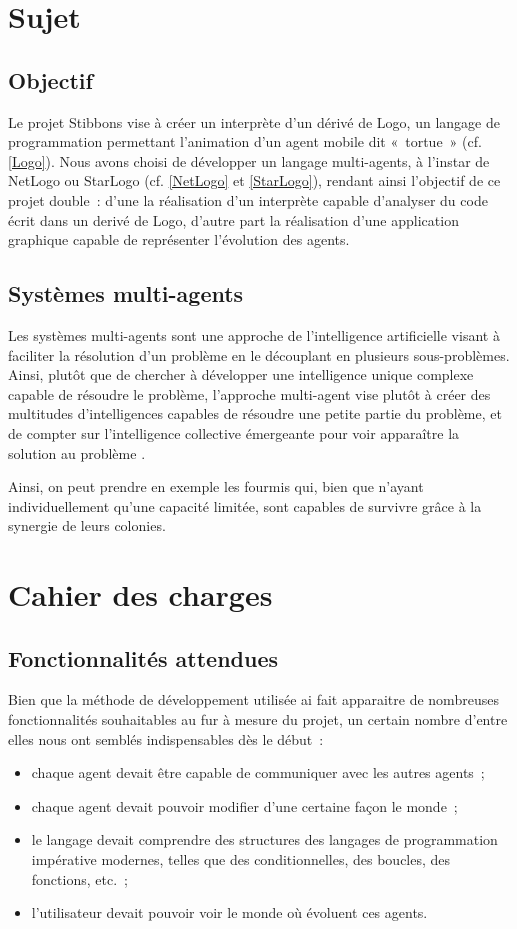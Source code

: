 \section{Sujet}
	\subsection{Objectif}
	Le projet Stibbons vise à créer un interprète d'un dérivé de Logo, un langage de programmation permettant l'animation d'un agent mobile dit «~tortue~» (cf. \ref{Logo}). Nous avons choisi de développer un langage multi-agents, à l'instar de NetLogo ou StarLogo (cf. \ref{NetLogo} et \ref{StarLogo}), rendant ainsi l'objectif de ce projet double~: d'une la réalisation d'un interprète capable d'analyser du code écrit dans un derivé de Logo, d'autre part la réalisation d'une application graphique capable de représenter l'évolution des agents.

	\subsection{Systèmes multi-agents}
	Les systèmes multi-agents sont une approche de l'intelligence artificielle visant à faciliter la résolution d'un problème en le découplant en plusieurs sous-problèmes. Ainsi, plutôt que de chercher à développer une intelligence unique complexe capable de résoudre le problème, l'approche multi-agent vise plutôt à créer des multitudes d'intelligences capables de résoudre une petite partie du problème, et de compter sur l'intelligence collective émergeante pour voir apparaître la solution au problème \cite{sma}.

	Ainsi, on peut prendre en exemple les fourmis qui, bien que n'ayant individuellement qu'une capacité limitée, sont capables de survivre grâce à la synergie de leurs colonies.

\section{Cahier des charges}
	\subsection{Fonctionnalités attendues}
	Bien que la méthode de développement utilisée ai fait apparaitre de nombreuses fonctionnalités souhaitables au fur à mesure du projet, un certain nombre d'entre elles nous ont semblés indispensables dès le début~:
	\begin{itemize}
		\item chaque agent devait être capable de communiquer avec les autres agents~;
		\item chaque agent devait pouvoir modifier d'une certaine façon le monde~;
		\item le langage devait comprendre des structures des langages de programmation impérative modernes, telles que des conditionnelles, des boucles, des fonctions, etc.~;
		\item l'utilisateur devait pouvoir voir le monde où évoluent ces agents.
	\end{itemize}

